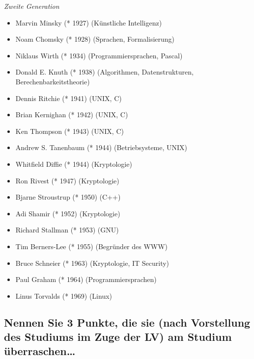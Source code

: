 \emph{Zweite Generation}

\begin{itemize}
  \item Marvin Minsky (* 1927) (Künstliche Intelligenz)
  \item Noam Chomsky (* 1928) (Sprachen, Formalisierung)
  \item Niklaus Wirth (* 1934) (Programmiersprachen, Pascal)
  \item Donald E. Knuth (* 1938) (Algorithmen, Datenstrukturen,
    Berechenbarkeitstheorie)
  \item Dennis Ritchie (* 1941) (UNIX, C)
  \item Brian Kernighan (* 1942) (UNIX, C)
  \item Ken Thompson (* 1943) (UNIX, C)
  \item Andrew S. Tanenbaum (* 1944) (Betriebsysteme, UNIX)
  \item Whitfield Diffie (* 1944) (Kryptologie)
  \item Ron Rivest (* 1947) (Kryptologie)
  \item Bjarne Stroustrup (* 1950) (C++)
  \item Adi Shamir (* 1952) (Kryptologie)
  \item Richard Stallman (* 1953) (GNU)
  \item Tim Berners-Lee (* 1955) (Begründer des WWW)
  \item Bruce Schneier (* 1963) (Kryptologie, IT Security)
  \item Paul Graham (* 1964) (Programmiersprachen)
  \item Linus Torvalds (* 1969) (Linux)
\end{itemize}

\subsection{Nennen Sie 3 Punkte, die sie (nach Vorstellung des Studiums
    im Zuge der LV) am Studium überraschen\dots}


